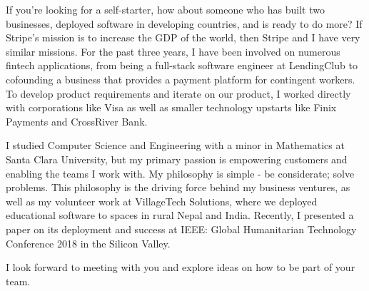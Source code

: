 \documentclass[10pt,a4paper,sans]{moderncv}        %
\begin{document}
If you're looking for a self-starter, how about someone who has built two businesses, deployed software in developing countries, and is ready to do more? If Stripe's mission is to increase the GDP of the world, then Stripe and I have very similar missions. For the past three years, I have been involved on numerous fintech applications, from being a full-stack software engineer at LendingClub to cofounding a business that provides a payment platform for contingent workers. To develop product requirements and iterate on our product, I worked directly with corporations like Visa as well as smaller technology upstarts like Finix Payments and CrossRiver Bank.

I studied Computer Science and Engineering with a minor in Mathematics at Santa Clara University, but my primary passion is empowering customers and enabling the teams I work with. My philosophy is simple - be considerate; solve problems. This philosophy is the driving force behind my business ventures, as well as my volunteer work at VillageTech Solutions, where we deployed educational software to spaces in rural Nepal and India. Recently, I presented a paper on its deployment and success at IEEE: Global Humanitarian Technology Conference 2018 in the Silicon Valley.

I look forward to meeting with you and explore ideas on how to be part of your team.

\makeletterclosing

\end{document}
